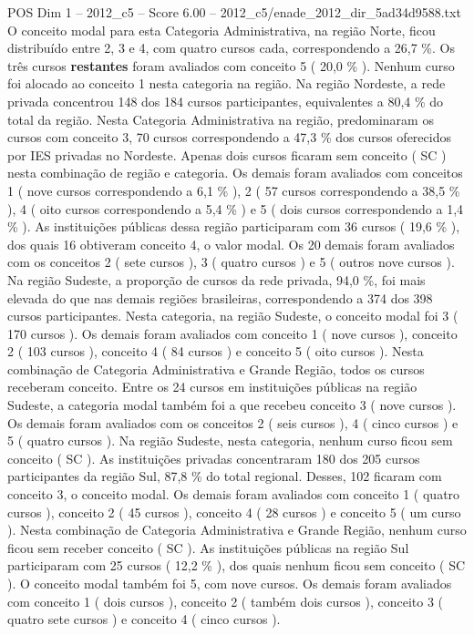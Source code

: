 \begin{textsample}{POS Dim 1 – 2012\_c5 – Score 6.00 – 2012\_c5/enade\_2012\_dir\_5ad34d9588.txt}
O conceito modal para esta Categoria Administrativa, na região Norte, ficou distribuído entre 2, 3 e 4, com quatro cursos cada, correspondendo a 26,7 \%.
Os três cursos \textbf{restantes} foram avaliados com conceito 5 ( 20,0 \% ).
Nenhum curso foi alocado ao conceito 1 nesta categoria na região.
Na região Nordeste, a rede privada concentrou 148 dos 184 cursos participantes, equivalentes a 80,4 \% do total da região.
Nesta Categoria Administrativa na região, predominaram os cursos com conceito 3, 70 cursos correspondendo a 47,3 \% dos cursos oferecidos por IES privadas no Nordeste.
Apenas dois cursos ficaram sem conceito ( SC ) nesta combinação de região e categoria.
Os demais foram avaliados com conceitos 1 ( nove cursos correspondendo a 6,1 \% ), 2 ( 57 cursos correspondendo a 38,5 \% ), 4 ( oito cursos correspondendo a 5,4 \% ) e 5 ( dois cursos correspondendo a 1,4 \% ).
As instituições públicas dessa região participaram com 36 cursos ( 19,6 \% ), dos quais 16 obtiveram conceito 4, o valor modal.
Os 20 demais foram avaliados com os conceitos 2 ( sete cursos ), 3 ( quatro cursos ) e 5 ( outros nove cursos ).
Na região Sudeste, a proporção de cursos da rede privada, 94,0 \%, foi mais elevada do que nas demais regiões brasileiras, correspondendo a 374 dos 398 cursos participantes.
Nesta categoria, na região Sudeste, o conceito modal foi 3 ( 170 cursos ).
Os demais foram avaliados com conceito 1 ( nove cursos ), conceito 2 ( 103 cursos ), conceito 4 ( 84 cursos ) e conceito 5 ( oito cursos ).
Nesta combinação de Categoria Administrativa e Grande Região, todos os cursos receberam conceito.
Entre os 24 cursos em instituições públicas na região Sudeste, a categoria modal também foi a que recebeu conceito 3 ( nove cursos ).
Os demais foram avaliados com os conceitos 2 ( seis cursos ), 4 ( cinco cursos ) e 5 ( quatro cursos ).
Na região Sudeste, nesta categoria, nenhum curso ficou sem conceito ( SC ).
As instituições privadas concentraram 180 dos 205 cursos participantes da região Sul, 87,8 \% do total regional.
Desses, 102 ficaram com conceito 3, o conceito modal.
Os demais foram avaliados com conceito 1 ( quatro cursos ), conceito 2 ( 45 cursos ), conceito 4 ( 28 cursos ) e conceito 5 ( um curso ).
Nesta combinação de Categoria Administrativa e Grande Região, nenhum curso ficou sem receber conceito ( SC ).
As instituições públicas na região Sul participaram com 25 cursos ( 12,2 \% ), dos quais nenhum ficou sem conceito ( SC ).
O conceito modal também foi 5, com nove cursos.
Os demais foram avaliados com conceito 1 ( dois cursos ), conceito 2 ( também dois cursos ), conceito 3 ( quatro sete cursos ) e conceito 4 ( cinco cursos ).

\end{textsample}
